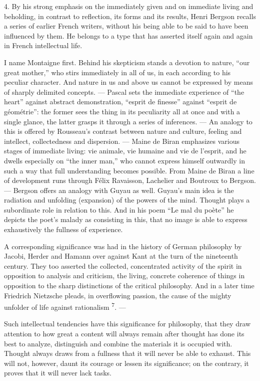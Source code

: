 \documentclass[12pt,a4paper,openany]{book}
\newcommand{\opage}[1]{\marginnote{\footnotesize\textit{[#1]}}}
\newcommand{\nm}[1]{\unskip\textsuperscript{#1}}
\begin{document}
4. By his strong emphasis on the immediately given and on immediate living and beholding, in contrast to reflection, its forms and its results, Henri Bergson recalls a series of earlier French writers, without his
\opage{9}being able to be said to have been influenced by them. He belongs to a type that has asserted itself again and again in French intellectual life.

I name Montaigne first. Behind his skepticism stands a devotion to nature, ``our great mother,'' who stirs immediately in all of us, in each according to his peculiar character. And nature in us and above us cannot be expressed by means of sharply delimited concepts. --- Pascal sets the immediate experience of ``the heart'' against abstract demonstration, ``esprit de finesse'' against ``esprit de géométrie'': the former sees the thing in its peculiarity all at once and with a single glance, the latter grasps it through a series of inferences. --- An analogy to this is offered by Rousseau's contrast between nature and culture, feeling and intellect, collectedness and dispersion. --- Maine de Biran emphasizes various stages of immediate living: vie animale, vie humaine and vie de l'esprit, and he dwells especially on ``the inner man,'' who cannot express himself outwardly in such a way that full understanding becomes possible. From Maine de Biran a line of development runs through Félix Ravaisson, Lachelier and Boutroux to Bergson. --- Bergson offers an analogy with Guyau as well. Guyau's main idea is the radiation and unfolding (expansion) of the powers of the mind. Thought plays a subordinate role in relation to this. And in his poem ``Le mal du poète'' he depicts the poet's malady as consisting in this, that no image is able to express exhaustively the fullness of experience.

A corresponding significance was had in the history of German philosophy by Jacobi, Herder and Hamann over against Kant at the turn of the nineteenth century. They too asserted the collected, concentrated activity of the spirit in opposition to analysis and criticism, the living, concrete coherence of things in opposition to the sharp distinctions of the critical philosophy. And in a later time Friedrich Nietzsche pleads, in overflowing passion, the cause of the mighty unfolder of life against rationalism \nm{7}. ---

Such intellectual tendencies have this significance for philosophy, that they draw attention to how great a content will always remain after thought has done its best to analyze, distinguish and combine the materials it is
\opage{10}occupied with. Thought always draws from a fullness that it will never be able to exhaust. This will not, however, daunt its courage or lessen its significance; on the contrary, it proves that it will never lack tasks.
\end{document}
